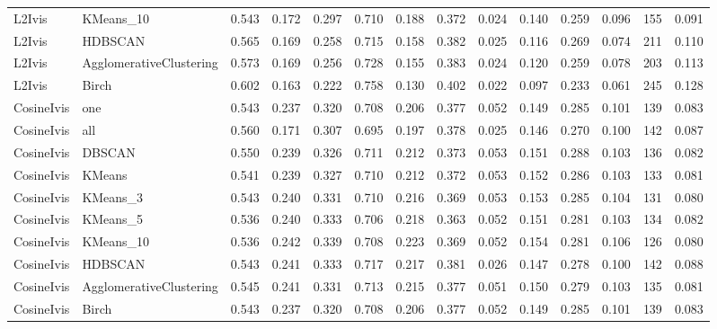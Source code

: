 \begin{tabular}{llrrrrrrrrrrrr}
L2Ivis & KMeans_10 & 0.543 & 0.172 & 0.297 & 0.710 & 0.188 & 0.372 & 0.024 & 0.140 & 0.259 & 0.096 & 155 & 0.091 \\
L2Ivis & HDBSCAN & 0.565 & 0.169 & 0.258 & 0.715 & 0.158 & 0.382 & 0.025 & 0.116 & 0.269 & 0.074 & 211 & 0.110 \\
L2Ivis & AgglomerativeClustering & 0.573 & 0.169 & 0.256 & 0.728 & 0.155 & 0.383 & 0.024 & 0.120 & 0.259 & 0.078 & 203 & 0.113 \\
L2Ivis & Birch & 0.602 & 0.163 & 0.222 & 0.758 & 0.130 & 0.402 & 0.022 & 0.097 & 0.233 & 0.061 & 245 & 0.128 \\
CosineIvis & one & 0.543 & 0.237 & 0.320 & 0.708 & 0.206 & 0.377 & 0.052 & 0.149 & 0.285 & 0.101 & 139 & 0.083 \\
CosineIvis & all & 0.560 & 0.171 & 0.307 & 0.695 & 0.197 & 0.378 & 0.025 & 0.146 & 0.270 & 0.100 & 142 & 0.087 \\
CosineIvis & DBSCAN & 0.550 & 0.239 & 0.326 & 0.711 & 0.212 & 0.373 & 0.053 & 0.151 & 0.288 & 0.103 & 136 & 0.082 \\
CosineIvis & KMeans & 0.541 & 0.239 & 0.327 & 0.710 & 0.212 & 0.372 & 0.053 & 0.152 & 0.286 & 0.103 & 133 & 0.081 \\
CosineIvis & KMeans_3 & 0.543 & 0.240 & 0.331 & 0.710 & 0.216 & 0.369 & 0.053 & 0.153 & 0.285 & 0.104 & 131 & 0.080 \\
CosineIvis & KMeans_5 & 0.536 & 0.240 & 0.333 & 0.706 & 0.218 & 0.363 & 0.052 & 0.151 & 0.281 & 0.103 & 134 & 0.082 \\
CosineIvis & KMeans_10 & 0.536 & 0.242 & 0.339 & 0.708 & 0.223 & 0.369 & 0.052 & 0.154 & 0.281 & 0.106 & 126 & 0.080 \\
CosineIvis & HDBSCAN & 0.543 & 0.241 & 0.333 & 0.717 & 0.217 & 0.381 & 0.026 & 0.147 & 0.278 & 0.100 & 142 & 0.088 \\
CosineIvis & AgglomerativeClustering & 0.545 & 0.241 & 0.331 & 0.713 & 0.215 & 0.377 & 0.051 & 0.150 & 0.279 & 0.103 & 135 & 0.081 \\
CosineIvis & Birch & 0.543 & 0.237 & 0.320 & 0.708 & 0.206 & 0.377 & 0.052 & 0.149 & 0.285 & 0.101 & 139 & 0.083 \\
\bottomrule
\end{tabular}
